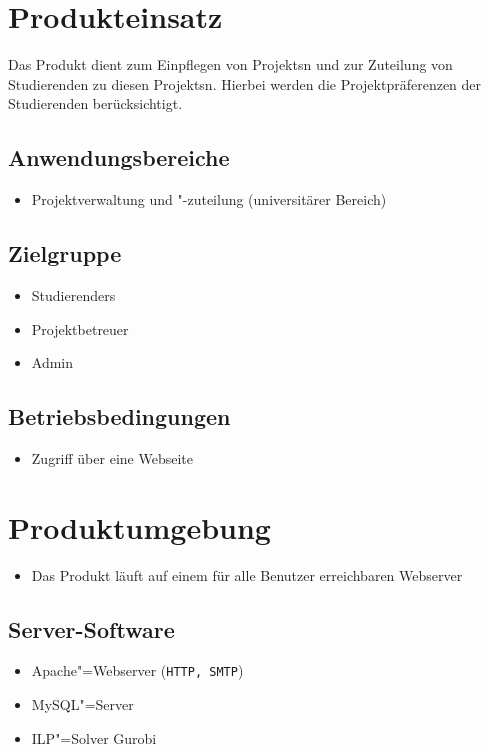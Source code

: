 \documentclass[parskip=full]{scrartcl}
\begin{document}
\section{Produkteinsatz}
Das Produkt dient zum Einpflegen von \glspl{Projekt}n und zur Zuteilung von
Studierenden zu diesen \glspl{Projekt}n. Hierbei werden die Projektpräferenzen der
Studierenden berücksichtigt.


\subsection{Anwendungsbereiche}

\begin{itemize} 
  \item Projektverwaltung und "-zuteilung (universitärer Bereich) %
\end{itemize}

\subsection{Zielgruppe}
\begin{itemize} 
  \item \glspl{Studierender}
  \item \gls{Projektbetreuer}
  \item \gls{Admin}
\end{itemize}

\subsection{Betriebsbedingungen}
\begin{itemize} 
  \item Zugriff über eine Webseite
\end{itemize}
\section{Produktumgebung}

\begin{itemize} 
  \item Das Produkt läuft auf einem für alle Benutzer erreichbaren Webserver
\end{itemize}
\subsection{Server-Software}
\begin{itemize} 
  \item Apache"=Webserver (\texttt{HTTP, SMTP})
  \item MySQL"=Server
  \item ILP"=Solver Gurobi %
\end{itemize}
\end{document}
